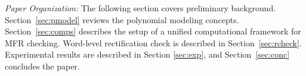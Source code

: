 




{\it Paper Organization:} The following section covers preliminary
background. Section~\ref{sec:pmodel} reviews the polynomial modeling concepts.
Section~\ref{sec:comps} describes the setup of a unified computational
framework for MFR checking. Word-level rectification check is described in
Section~\ref{sec:rcheck}.
Experimental results are described in Section \ref{sec:exp}, and
Section~\ref{sec:conc} concludes the paper. 